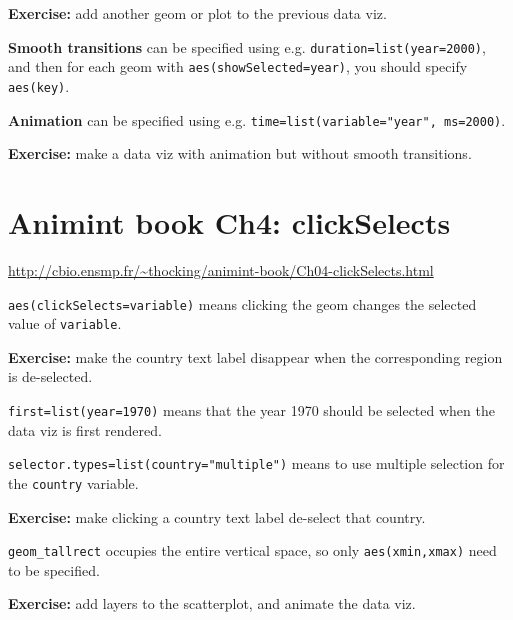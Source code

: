 \documentclass{article}
\begin{document}
\textbf{Exercise:} add another geom or plot to the previous data viz.

\hrulefill

\textbf{Smooth transitions} can be specified using
e.g. \texttt{duration=list(year=2000)},\\and then for each geom with
\texttt{aes(showSelected=year)}, you should specify \texttt{aes(key)}.

\textbf{Animation} can be specified using
e.g. \texttt{time=list(variable="year", ms=2000)}.

\textbf{Exercise:} make a data viz with animation but without smooth
transitions.

\section*{Animint book Ch4: clickSelects}
\url{http://cbio.ensmp.fr/~thocking/animint-book/Ch04-clickSelects.html}

\hrulefill

\texttt{aes(clickSelects=variable)} means clicking the geom changes
the selected value of \texttt{variable}.

\textbf{Exercise:} make the country text label disappear when the
corresponding region is de-selected.

\hrulefill

\texttt{first=list(year=1970)} means that the year 1970 should be
selected when the data viz is first rendered.

\texttt{selector.types=list(country="multiple")} means to use multiple
selection for the \texttt{country} variable.

\textbf{Exercise:} make clicking a country text label de-select that
country.

\hrulefill

\verb|geom_tallrect| occupies the entire vertical space, so only
\texttt{aes(xmin,xmax)} need to be specified.

\textbf{Exercise:} add layers to the scatterplot, and animate the data viz.
\end{document}

